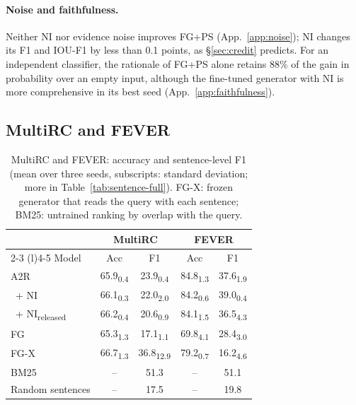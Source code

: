 \documentclass[11pt]{article}
\begin{document}
\paragraph{Noise and faithfulness.}
Neither NI nor evidence noise improves FG+PS (App.~\ref{app:noise}); NI changes its F1 and IOU-F1 by less than 0.1 points, as \S\ref{sec:credit} predicts. For an independent classifier, the rationale of FG+PS alone retains 88\% of the gain in probability over an empty input, although the fine-tuned generator with NI is more comprehensive in its best seed (App.~\ref{app:faithfulness}).

\subsection{MultiRC and FEVER}
\label{sec:sentence}

\begin{table}[t]
\centering
\small
\setlength{\tabcolsep}{5pt}
\begin{tabular}{@{}lcccc@{}}
\toprule
& \multicolumn{2}{c}{MultiRC} & \multicolumn{2}{c}{FEVER} \\
\cmidrule(lr){2-3} \cmidrule(l){4-5}
Model & Acc & F1 & Acc & F1 \\
\midrule
A2R & 65.9\textsubscript{0.4} & 23.9\textsubscript{0.4} & 84.8\textsubscript{1.3} & 37.6\textsubscript{1.9} \\
\ + NI & 66.1\textsubscript{0.3} & 22.0\textsubscript{2.0} & 84.2\textsubscript{0.6} & 39.0\textsubscript{0.4} \\
\ + NI\textsubscript{released} & 66.2\textsubscript{0.4} & 20.6\textsubscript{0.9} & 84.1\textsubscript{1.5} & 36.5\textsubscript{4.3} \\
FG & 65.3\textsubscript{1.3} & 17.1\textsubscript{1.1} & 69.8\textsubscript{4.1} & 28.4\textsubscript{3.0} \\
FG-X & 66.7\textsubscript{1.3} & 36.8\textsubscript{12.9} & 79.2\textsubscript{0.7} & 16.2\textsubscript{4.6} \\
\midrule
BM25 & -- & 51.3 & -- & 51.1 \\
Random sentences & -- & 17.5 & -- & 19.8 \\
\bottomrule
\end{tabular}
\caption{MultiRC and FEVER: accuracy and sentence-level F1 (mean over three seeds, subscripts: standard deviation; more in Table~\ref{tab:sentence-full}). FG-X: frozen generator that reads the query with each sentence; BM25: untrained ranking by overlap with the query.}
\label{tab:sentence}
\end{table}
\end{document}
